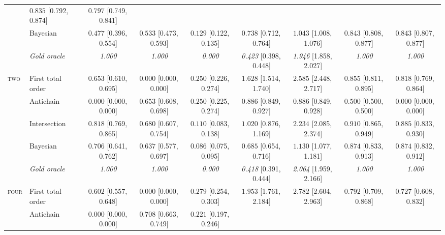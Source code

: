 \begin{landscape}
\begin{table}[p]
\begin{tabular}{@{}ll ccccccc@{}}
   & $0.835$ \tiny[0.792,\,0.874]
   & $0.797$ \tiny[0.749,\,0.841] \\
 & Bayesian
   & $0.477$ \tiny[0.396,\,0.554]
   & $0.533$ \tiny[0.473,\,0.593]
   & $\mathbf{0.129}$ \tiny[0.122,\,0.135]
   & $\mathbf{0.738}$ \tiny[0.712,\,0.764]
   & $1.043$ \tiny[1.008,\,1.076]
   & $0.843$ \tiny[0.808,\,0.877]
   & $0.843$ \tiny[0.807,\,0.877] \\
 & \textit{Gold oracle}
   & \textit{1.000} & \textit{1.000} & \textit{0.000}
   & \textit{0.423} \tiny[0.398,\,0.448]
   & \textit{1.946} \tiny[1.858,\,2.027]
   & \textit{1.000} & \textit{1.000} \\
\midrule
\multirow{5}{*}{\textsc{two}}
 & First total order
   & $0.653$ \tiny[0.610,\,0.695]
   & $0.000$ \tiny[0.000,\,0.000]
   & $0.250$ \tiny[0.226,\,0.274]
   & $1.628$ \tiny[1.514,\,1.740]
   & $2.585$ \tiny[2.448,\,2.717]
   & $0.855$ \tiny[0.811,\,0.895]
   & $0.818$ \tiny[0.769,\,0.864] \\
 & Antichain
   & $0.000$ \tiny[0.000,\,0.000]
   & $0.653$ \tiny[0.608,\,0.698]
   & $0.250$ \tiny[0.225,\,0.274]
   & $0.886$ \tiny[0.849,\,0.927]
   & $0.886$ \tiny[0.849,\,0.928]
   & $0.500$ \tiny[0.500,\,0.500]
   & $0.000$ \tiny[0.000,\,0.000] \\
 & Intersection
   & $\mathbf{0.818}$ \tiny[0.769,\,0.865]
   & $0.680$ \tiny[0.607,\,0.754]
   & $0.110$ \tiny[0.083,\,0.138]
   & $1.020$ \tiny[0.876,\,1.169]
   & $2.234$ \tiny[2.085,\,2.374]
   & $0.910$ \tiny[0.865,\,0.949]
   & $0.885$ \tiny[0.833,\,0.930] \\
 & Bayesian
   & $0.706$ \tiny[0.641,\,0.762]
   & $0.637$ \tiny[0.577,\,0.697]
   & $\mathbf{0.086}$ \tiny[0.075,\,0.095]
   & $\mathbf{0.685}$ \tiny[0.654,\,0.716]
   & $1.130$ \tiny[1.077,\,1.181]
   & $0.874$ \tiny[0.833,\,0.913]
   & $0.874$ \tiny[0.832,\,0.912] \\
 & \textit{Gold oracle}
   & \textit{1.000} & \textit{1.000} & \textit{0.000}
   & \textit{0.418} \tiny[0.391,\,0.444]
   & \textit{2.064} \tiny[1.959,\,2.166]
   & \textit{1.000} & \textit{1.000} \\
\midrule
\multirow{5}{*}{\textsc{four}}
 & First total order
   & $0.602$ \tiny[0.557,\,0.648]
   & $0.000$ \tiny[0.000,\,0.000]
   & $0.279$ \tiny[0.254,\,0.303]
   & $1.953$ \tiny[1.761,\,2.184]
   & $2.782$ \tiny[2.604,\,2.963]
   & $0.792$ \tiny[0.709,\,0.868]
   & $0.727$ \tiny[0.608,\,0.832] \\
 & Antichain
   & $0.000$ \tiny[0.000,\,0.000]
   & $0.708$ \tiny[0.663,\,0.749]
   & $0.221$ \tiny[0.197,\,0.246]

\end{tabular}
\end{table}
\end{landscape}
